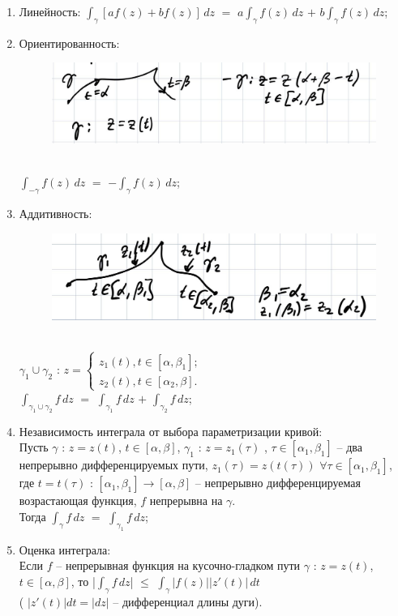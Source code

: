 \begin{enumerate}
    \item Линейность: \(\int_{\gamma} [af(z) + bf(z)]\, dz\) $=$ $a$\(\int_{\gamma} f(z)\, dz\) $+$ $b$\(\int_{\gamma} f(z)\, dz\);
    \item Ориентированность:
    \begin{figure}[!ht]
    \includegraphics[scale=0.2]{answers/img/pic1.jpg}
    \end{figure}\\
    \(\int_{-\gamma} f(z)\, dz\) $=$ $-$\(\int_{\gamma} f(z)\, dz\);
    \item Аддитивность:\\
    \begin{figure}[!ht]
    \includegraphics[scale=0.2]{answers/img/pic2.jpg}
    \end{figure}\\
    $\gamma_1 \cup \gamma_2$ : $z = 
    \begin{cases}
        z_1(t), t \in [\alpha, \beta_1];\\
        z_2(t), t \in [\alpha_2, \beta].
    \end{cases}$\\
    \(\int_{\gamma_1 \cup \gamma_2} f\, dz\) $=$ \(\int_{\gamma_1} f\, dz\) $+$ \(\int_{\gamma_2} f\, dz\);
    \item Независимость интеграла от выбора параметризации кривой:\\
    Пусть $\gamma$ : $z = z(t)$, $t \in [\alpha, \beta]$, $\gamma_1$ : $z = z_1(\tau)$ , $\tau \in [\alpha_1, \beta_1]$ -- два непрерывно дифференцируемых пути, $z_1(\tau) = z(t(\tau))$ $\forall \tau \in [\alpha_1, \beta_1]$, где $t = t(\tau)$ : $[\alpha_1, \beta_1] \rightarrow [\alpha, \beta]$ -- непрерывно дифференцируемая возрастающая функция, $f$ непрерывна на $\gamma$.\\
    Тогда \(\int_{\gamma} f\, dz\) $=$ \(\int_{\gamma_1} f\, dz\);
    \item Оценка интеграла:\\
    Если $f$ -- непрерывная функция на кусочно-гладком пути $\gamma$ : $z = z(t)$, $t \in [\alpha, \beta]$, то 
    |\(\int_{\gamma} f\, dz\)| $\leq$ \(\int_{\gamma} |f(z)||z'(t)|\, dt\)\\ 
    ( $|z'(t)|dt = |dz|$ -- дифференциал длины дуги).
\end{enumerate}

